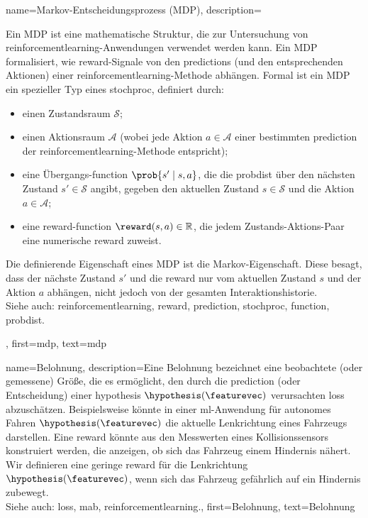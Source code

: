 {{{{
{name={Markov-Entscheidungsprozess (MDP)},
	description={Ein MDP ist eine mathematische Struktur, 
	die zur Untersuchung von \gls{reinforcementlearning}-Anwendungen verwendet werden kann. 
	Ein MDP formalisiert, wie \gls{reward}-Signale von den \glspl{prediction} (und den entsprechenden Aktionen) 
	einer \gls{reinforcementlearning}-Methode abhängen. Formal ist ein MDP ein spezieller Typ eines \gls{stochproc}, 
	definiert durch:
	\begin{itemize}
		\item einen Zustandsraum $\mathcal{S}$;
		\item einen Aktionsraum $\mathcal{A}$ (wobei jede Aktion $a \in \mathcal{A}$ einer bestimmten 
		\gls{prediction} der \gls{reinforcementlearning}-Methode entspricht);
		\item eine Übergangs-\gls{function} $\prob{s' \mid s, a}$, die die \gls{probdist} über den 
		nächsten Zustand $s' \in \mathcal{S}$ angibt, gegeben den aktuellen Zustand $s \in \mathcal{S}$ 
		und die Aktion $a \in \mathcal{A}$;
		\item eine \gls{reward}-\gls{function} $\reward(s, a) \in \mathbb{R}$, die jedem Zustands-Aktions-Paar 
		eine numerische \gls{reward} zuweist.
	\end{itemize}
	Die definierende Eigenschaft eines MDP ist die Markov-Eigenschaft. 
	Diese besagt, dass der nächste Zustand $s'$ und die \gls{reward} nur vom aktuellen Zustand $s$ und der Aktion $a$ abhängen, 
	nicht jedoch von der gesamten Interaktionshistorie.\\
	Siehe auch: \gls{reinforcementlearning}, \gls{reward}, \gls{prediction}, \gls{stochproc}, \gls{function}, \gls{probdist}.},
	first={mdp},
	text={mdp} 
}

{name={Belohnung}, 
	description={Eine Belohnung bezeichnet eine beobachtete (oder gemessene) Größe, 
	die es ermöglicht, den durch die \gls{prediction} (oder Entscheidung) einer \gls{hypothesis} $\hypothesis(\featurevec)$ 
	verursachten \gls{loss} abzuschätzen. 
	Beispielsweise könnte in einer \gls{ml}-Anwendung für autonomes Fahren $\hypothesis(\featurevec)$ 
	die aktuelle Lenkrichtung eines Fahrzeugs darstellen. 
	Eine \gls{reward} könnte aus den Messwerten eines Kollisionssensors konstruiert werden, 
	die anzeigen, ob sich das Fahrzeug einem Hindernis nähert. 
	Wir definieren eine geringe \gls{reward} für die Lenkrichtung $\hypothesis(\featurevec)$, 
	wenn sich das Fahrzeug gefährlich auf ein Hindernis zubewegt.\\
	Siehe auch: \gls{loss}, \gls{mab}, \gls{reinforcementlearning}.},
	first={Belohnung}, 
	text={Belohnung}
} 

}}}}
